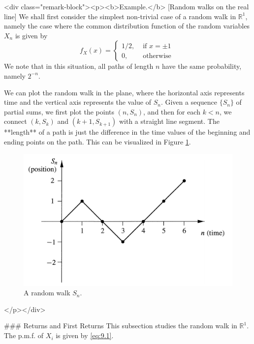 <div class="remark-block"><p><b>Example.</b> [Random walks on the real line]
We shall first consider the simplest non-trivial case of a random walk in $\mathbb{R}^1$, namely the case where the common distribution function of the random variables $X_n$ is given by
$$$$$$$$\begin{equation}
    \label{eq:9.1}
    \tag{9-1}
    f_{X}(x)=\left\{\begin{array}{ll}{1 / 2,} & {\text { if } x=\pm 1} \\ {0,} & {\text { otherwise }}\end{array}\right.
\end{equation}$$$$$$$$
We note that in this situation, all paths of length $n$ have the same probability, namely $2^{-n}$.

We can plot the random walk in the plane, where the horizontal axis represents time and the vertical axis represents the value of $S_n$. Given a sequence $\{S_n\}$ of partial sums, we first plot the points $(n, S_n)$, and then for each $k < n$, we connect $(k, S_k)$ and $(k + 1, S_{k+1})$ with a straight line segment. The **length** of a path is just the difference in the time values of the beginning and ending points on the path. This can be visualized in Figure \ref{fig:9.1}.

\begin{figure}[!htb]
    \centering
    \includegraphics[scale=0.3]{plots/random_walk.png}
    \caption{A random walk $S_n$.}
    \label{fig:9.1}
\end{figure}
</p></div>



### Returns and First Returns
This subsection studies the random walk in $\mathbb{R}^1$. The p.m.f. of $X_i$ is given by \eqref{eq:9.1}.

